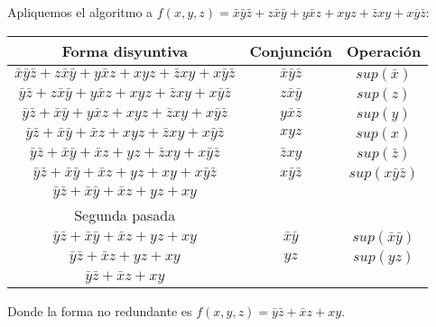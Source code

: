\begin{ejemplo}
    Apliquemos el algoritmo a $f(x,y,z) =\bar{x}\bar{y}\bar{z}+z\bar{x}\bar{y}+y\bar{x}z+xyz+\bar{z}xy+x\bar{y}\bar{z}$:
    \begin{center}
        \begin{tabular}{ |c|c|c|  }
            \hline
            Forma disyuntiva                                                                                                             & Conjunción                             & Operación                        \\
            \hline
            $\bar{x}\bar{y}\bar{z}+z\bar{x}\bar{y}+y\bar{x}z+xyz+\bar{z}xy+x\bar{y}\bar{z}$ & $\bar{x}\bar{y}\bar{z}$ & $sup(\bar{x})$              \\
            $\bar{y}\bar{z}+z\bar{x}\bar{y}+y\bar{x}z+xyz+\bar{z}xy+x\bar{y}\bar{z}$             & $z\bar{x}\bar{y}$            & $sup(z)$                         \\
            $\bar{y}\bar{z}+\bar{x}\bar{y}+y\bar{x}z+xyz+\bar{z}xy+x\bar{y}\bar{z}$              & $y\bar{x}\bar{z}$            & $sup(y)$                         \\
            $\bar{y}\bar{z}+\bar{x}\bar{y}+\bar{x}z+xyz+\bar{z}xy+x\bar{y}\bar{z}$               & $xyz$                                  & $sup(x)$                         \\
            $\bar{y}\bar{z}+\bar{x}\bar{y}+\bar{x}z+yz+\bar{z}xy+x\bar{y}\bar{z}$                & $\bar{z}xy$                       & $sup(\bar{z})$              \\
            $\bar{y}\bar{z}+\bar{x}\bar{y}+\bar{x}z+yz+xy+x\bar{y}\bar{z}$                            & $x\bar{y}\bar{z}$            & $sup(x\bar{y}\bar{z})$ \\
            $\bar{y}\bar{z}+\bar{x}\bar{y}+\bar{x}z+yz+xy$                                                      &                                        &                                  \\
            Segunda pasada                                                                                                               &                                        &                                  \\
            $\bar{y}\bar{z}+\bar{x}\bar{y}+\bar{x}z+yz+xy$                                                      & $\bar{x}\bar{y}$             & $sup(\bar{x}\bar{y})$  \\
            $\bar{y}\bar{z}+\bar{x}z+yz+xy$                                                                               & $yz$                                   & $sup(yz)$                        \\
            $\bar{y}\bar{z}+\bar{x}z+xy$                                                                                  &                                        &                                  \\
            \hline
        \end{tabular}
    \end{center}
    Donde la forma no redundante es $f(x,y,z) =\bar{y}\bar{z}+\bar{x}z+xy$.


\end{ejemplo}
